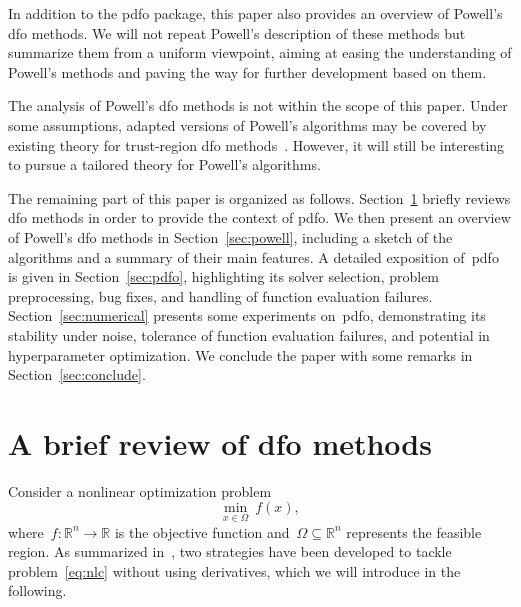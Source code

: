 \documentclass[
    smallextended,  %
    draft,          %
    final,          %
]{svjour3}
\newcommand{\R}{\mathbb{R}}
\newcommand{\fset}{\Omega}
\newcommand{\obj}{f}
\begin{document}
In addition to the \gls{pdfo} package, this paper also provides an overview of Powell's \gls{dfo}
methods.
We will not repeat Powell's description of these methods but summarize them from a uniform
viewpoint, aiming at easing the understanding of Powell's methods and paving the way for further
development based on them.

The analysis of Powell's \gls{dfo} methods is not within the scope of this paper.
Under some assumptions, adapted versions of Powell's algorithms may be covered by existing theory
for trust-region \gls{dfo} methods~\cite[Chapter~10]{Conn_Scheinberg_Vicente_2009b}.
However, it
will still be interesting to pursue a tailored theory for Powell's algorithms.

The remaining part of this paper is organized as follows.
Section~\ref{sec:dfo} briefly reviews \gls{dfo} methods in order to provide the context of \gls{pdfo}.
We then present an overview of Powell's \gls{dfo} methods in Section~\ref{sec:powell},
including a sketch of the algorithms and a summary of their main features.
A detailed exposition of~\gls{pdfo} is given in Section~\ref{sec:pdfo},
highlighting its solver selection, problem preprocessing, bug fixes,
and handling of function evaluation failures.
Section~\ref{sec:numerical} presents some experiments on~\gls{pdfo}, demonstrating its
stability under noise, tolerance of function evaluation failures, and potential in
hyperparameter optimization.
We conclude the paper with some remarks in Section~\ref{sec:conclude}.

\section{A brief review of \texorpdfstring{\gls{dfo}}{DFO} methods}
\label{sec:dfo}

Consider a nonlinear optimization problem
\begin{equation}
    \label{eq:nlc}
    \min_{x \in \fset} ~ \obj(x),
\end{equation}
where~$\obj : \R^n \to \R$ is the objective function and~$\fset \subseteq \R^n$ represents the feasible region.
As summarized in~\cite{Conn_Scheinberg_Vicente_2009b}, two strategies have been developed to tackle
problem~\eqref{eq:nlc} without using derivatives, which we will introduce in the following.
\end{document}
